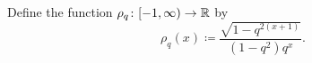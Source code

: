 \documentclass[11pt, reqno, a4paper, final]{amsart}
\theoremstyle{plain}
\theoremstyle{definition}
\newcommand{\NN}{{\mathbb N}}
\newcommand{\RR}{{\mathbb R}}
\newcommand{\black}{\color{black}}
\begin{document}

Define {\black the function} $\rho_q\colon {\black [-1,\infty)} \to \RR$ by
\[
\rho_q(x)\coloneqq \frac{\sqrt{1-q^{2(x+1)}}}{(1-q^2)q^x} .
\]
\end{document}
